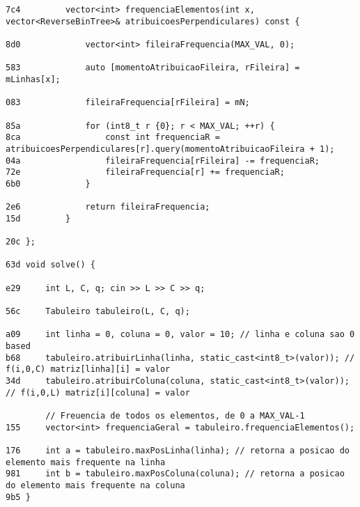\documentclass[11pt, a4paper, twoside]{article}
\begin{document}
\begin{lstlisting}
7c4         vector<int> frequenciaElementos(int x, vector<ReverseBinTree>& atribuicoesPerpendiculares) const {
                
8d0             vector<int> fileiraFrequencia(MAX_VAL, 0);
    
583             auto [momentoAtribuicaoFileira, rFileira] = mLinhas[x];
    
083             fileiraFrequencia[rFileira] = mN;
    
85a             for (int8_t r {0}; r < MAX_VAL; ++r) {
8ca                 const int frequenciaR = atribuicoesPerpendiculares[r].query(momentoAtribuicaoFileira + 1);
04a                 fileiraFrequencia[rFileira] -= frequenciaR;
72e                 fileiraFrequencia[r] += frequenciaR;
6b0             }
    
2e6             return fileiraFrequencia;
15d         }
    
20c };

63d void solve() {
    
e29     int L, C, q; cin >> L >> C >> q;
    
56c     Tabuleiro tabuleiro(L, C, q);
    
a09     int linha = 0, coluna = 0, valor = 10; // linha e coluna sao 0 based
b68     tabuleiro.atribuirLinha(linha, static_cast<int8_t>(valor)); // f(i,0,C) matriz[linha][i] = valor
34d     tabuleiro.atribuirColuna(coluna, static_cast<int8_t>(valor)); // f(i,0,L) matriz[i][coluna] = valor
    
        // Freuencia de todos os elementos, de 0 a MAX_VAL-1
155     vector<int> frequenciaGeral = tabuleiro.frequenciaElementos();
    
176     int a = tabuleiro.maxPosLinha(linha); // retorna a posicao do elemento mais frequente na linha
981     int b = tabuleiro.maxPosColuna(coluna); // retorna a posicao do elemento mais frequente na coluna
9b5 }
\end{lstlisting}
\end{document}
